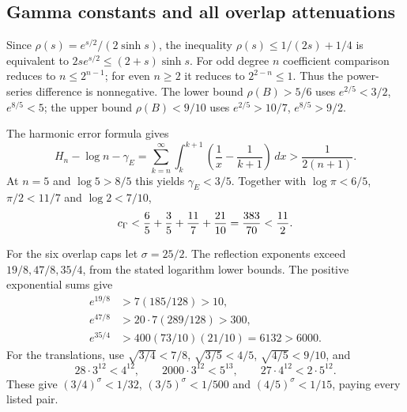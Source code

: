 \subsection{Gamma constants and all overlap attenuations}
Since $\rho(s)=e^{s/2}/(2\sinh s)$, the inequality
$\rho(s)\le1/(2s)+1/4$ is equivalent to
$2se^{s/2}\le(2+s)\sinh s$.
For odd degree $n$ coefficient comparison reduces to $n\le2^{n-1}$;
for even $n\ge2$ it reduces to $2^{2-n}\le1$.
Thus the power-series difference is nonnegative.
The lower bound $\rho(B)>5/6$ uses $e^{2/5}<3/2$, $e^{8/5}<5$;
the upper bound $\rho(B)<9/10$ uses $e^{2/5}>10/7$, $e^{8/5}>9/2$.

The harmonic error formula gives
\[
 H_n-\log n-\gamma_E
 =\sum_{k=n}^\infty\int_k^{k+1}\left(\frac1x-\frac1{k+1}\right)\,dx
 >\frac1{2(n+1)}.
\]
At $n=5$ and $\log5>8/5$ this yields $\gamma_E<3/5$.
Together with $\log\pi<6/5$, $\pi/2<11/7$ and $\log2<7/10$,
\[
 c_\Gamma<\frac65+\frac35+\frac{11}{7}+\frac{21}{10}
 =\frac{383}{70}<\frac{11}{2}.
\]

For the six overlap caps let $\sigma=25/2$.
The reflection exponents exceed $19/8,47/8,35/4$, from the stated logarithm lower bounds.
The positive exponential sums give
\begin{align*}
 e^{19/8}&>7(185/128)>10,\\
 e^{47/8}&>20\cdot7(289/128)>300,\\
 e^{35/4}&>400(73/10)(21/10)=6132>6000.
\end{align*}
For the translations, use
$\sqrt{3/4}<7/8$, $\sqrt{3/5}<4/5$, $\sqrt{4/5}<9/10$, and
\[
 28\cdot3^{12}<4^{12},\qquad
 2000\cdot3^{12}<5^{13},\qquad
 27\cdot4^{12}<2\cdot5^{12}.
\]
These give $(3/4)^\sigma<1/32$, $(3/5)^\sigma<1/500$ and
$(4/5)^\sigma<1/15$, paying every listed pair.
